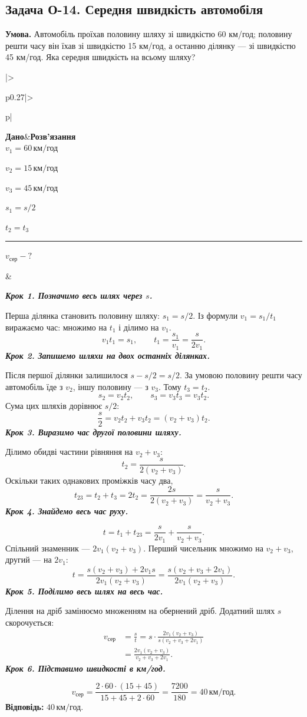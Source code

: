 \documentclass[12pt,a4paper]{article}
\newcommand{\target}[1]{\par\rule{\linewidth}{0.3pt}\par $#1-?$}
\newcommand{\why}[1]{\textbf{\textit{#1}}\par}
\newenvironment{solutiontwo}{\small\begin{tabular}{|>{\raggedright\arraybackslash}p{0.27\linewidth}|>{\raggedright\arraybackslash}p{\dimexpr0.73\linewidth-4\tabcolsep-3\arrayrulewidth\relax}|}\hline
\textbf{Дано}&\textbf{Розв'язання}\\\hline}{\\\hline\end{tabular}\par}
\begin{document}
\subsection*{Задача О-14. Середня швидкість автомобіля}
\textbf{Умова.} Автомобіль проїхав половину шляху зі швидкістю 60 км/год; половину решти часу він їхав зі швидкістю 15 км/год, а останню ділянку --- зі швидкістю 45 км/год. Яка середня швидкість на всьому шляху?

\begin{solutiontwo}
$v_1=60\,\text{км/год}$\par
$v_2=15\,\text{км/год}$\par
$v_3=45\,\text{км/год}$\par
$s_1=s/2$\par
$t_2=t_3$
\target{v_{\text{сер}}}

&

\setlength{\abovedisplayskip}{5pt}\setlength{\belowdisplayskip}{5pt}
\why{Крок 1. Позначимо весь шлях через $s$.}
Перша ділянка становить половину шляху: $s_1=s/2$. Із формули $v_1=s_1/t_1$ виражаємо час: множимо на $t_1$ і ділимо на $v_1$.
\[v_1t_1=s_1,\qquad t_1=\frac{s_1}{v_1}=\frac{s}{2v_1}.\]
\why{Крок 2. Запишемо шляхи на двох останніх ділянках.}
Після першої ділянки залишилося $s-s/2=s/2$. За умовою половину решти часу автомобіль їде з $v_2$, іншу половину --- з $v_3$. Тому $t_3=t_2$.
\[s_2=v_2t_2,\qquad s_3=v_3t_3=v_3t_2.\]
Сума цих шляхів дорівнює $s/2$:
\[\frac{s}{2}=v_2t_2+v_3t_2=(v_2+v_3)t_2.\]
\why{Крок 3. Виразимо час другої половини шляху.}
Ділимо обидві частини рівняння на $v_2+v_3$:
\[t_2=\frac{s}{2(v_2+v_3)}.\]
Оскільки таких однакових проміжків часу два,
\[t_{23}=t_2+t_3=2t_2=\frac{2s}{2(v_2+v_3)}=\frac{s}{v_2+v_3}.\]
\why{Крок 4. Знайдемо весь час руху.}
\[t=t_1+t_{23}=\frac{s}{2v_1}+\frac{s}{v_2+v_3}.\]
Спільний знаменник --- $2v_1(v_2+v_3)$. Перший чисельник множимо на $v_2+v_3$, другий --- на $2v_1$:
\[t=\frac{s(v_2+v_3)+2v_1s}{2v_1(v_2+v_3)}=\frac{s(v_2+v_3+2v_1)}{2v_1(v_2+v_3)}.\]
\why{Крок 5. Поділимо весь шлях на весь час.}
Ділення на дріб замінюємо множенням на обернений дріб. Додатний шлях $s$ скорочується:
\[
\begin{aligned}
v_{\text{сер}}&=\frac{s}{t}=s\cdot\frac{2v_1(v_2+v_3)}{s(v_2+v_3+2v_1)}\\
&=\frac{2v_1(v_2+v_3)}{v_2+v_3+2v_1}.
\end{aligned}
\]
\why{Крок 6. Підставимо швидкості в км/год.}
\[v_{\text{сер}}=\frac{2\cdot60\cdot(15+45)}{15+45+2\cdot60}=\frac{7200}{180}=40\,\text{км/год}.\]
\textbf{Відповідь:} $40\,\text{км/год}$.
\end{solutiontwo}
\newpage
\end{document}
